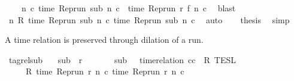 \begin{isabellebody}
\isanewline
\ \ \ \ {\isacartoucheopen}{\isasymforall}n\ c{\isachardot}\ time\ {\isacharparenleft}{\isacharparenleft}Rep{\isacharunderscore}run\ sub{\isacharparenright}\ n\ c{\isacharparenright}\ {\isacharequal}\ time\ {\isacharparenleft}{\isacharparenleft}Rep{\isacharunderscore}run\ r{\isacharparenright}\ {\isacharparenleft}f\ n{\isacharparenright}\ c{\isacharparenright}{\isacartoucheclose}\ \isamarkupfalse%
\ blast\isanewline
\ \ \isamarkupfalse%
\ \isamarkupfalse%
\ {\isacartoucheopen}{\isasymforall}n\ R\ {\isacharparenleft}time\ {\isacharparenleft}{\isacharparenleft}Rep{\isacharunderscore}run\ sub{\isacharparenright}\ n\ c\ time\ {\isacharparenleft}{\isacharparenleft}Rep{\isacharunderscore}run\ sub{\isacharparenright}\ n\ c\ \isamarkupfalse%
\ auto\isanewline
\ \ \isamarkupfalse%
\ {\isacharquery}thesis\ \isamarkupfalse%
\ simp\isanewline
{}\isamarkupfalse%
%
\endisatagproof
{\isafoldproof}%
%
\isadelimproof
%
\endisadelimproof
%
\begin{isamarkuptext}%
A time relation is preserved through dilation of a run.%
\end{isamarkuptext}\isamarkuptrue%
\isamarkupfalse%
\ tagrel{\isacharunderscore}sub{\isacharprime}{\isacharcolon}\isanewline
\ \ \ {\isacartoucheopen}sub\ {\isasymlless}\ r{\isacartoucheclose}\isanewline
\ \ \ \ \ \ \ {\isacartoucheopen}sub\ {\isasymin}\ {\isasymlbrakk}\ time{\isacharminus}relation\ {\isasymlfloor}cc\ {\isasymin}\ R\ {\isasymrbrakk}\isactrlsub T\isactrlsub E\isactrlsub S\isactrlsub L{\isacartoucheclose}\isanewline
\ \ \ \ \ {\isacartoucheopen}R\ {\isacharparenleft}time\ {\isacharparenleft}{\isacharparenleft}Rep{\isacharunderscore}run\ r{\isacharparenright}\ n\ c\ time\ {\isacharparenleft}{\isacharparenleft}Rep{\isacharunderscore}run\ r{\isacharparenright}\ n\ c\isanewline
%
\isadelimproof
%
\endisadelimproof
%
\isatagproof
{}\isamarkupfalse%
\ {\isacharminus}\isanewline
\ \ \isamarkupfalse%

\end{isabellebody}
